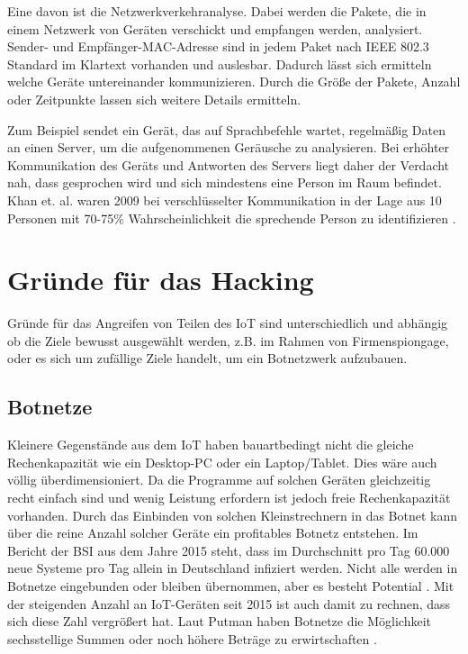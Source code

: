 \documentclass[12pt, a4paper, onecolumn, oneside, toc=bibliographynumbered, liststotoc]{scrreprt} %
\begin{document}
  Eine davon ist die Netzwerkverkehranalyse. Dabei werden die Pakete, die in einem Netzwerk von Geräten verschickt und empfangen werden, analysiert. Sender- und Empfänger\hyphen MAC\hyphen Adresse sind in jedem Paket nach IEEE 802.3 Standard im Klartext vorhanden und auslesbar. Dadurch lässt sich ermitteln welche Geräte untereinander kommunizieren. Durch die Größe der Pakete, Anzahl oder Zeitpunkte lassen sich weitere Details ermitteln.
  
  Zum Beispiel sendet ein Gerät, das auf Sprachbefehle wartet, regelmäßig Daten an einen Server, um die aufgenommenen Geräusche zu analysieren. Bei erhöhter Kommunikation des Geräts und Antworten des Servers liegt daher der Verdacht nah, dass gesprochen wird und sich mindestens eine Person im Raum befindet. Khan et. al. waren 2009 bei verschlüsselter Kommunikation in der Lage aus 10 Personen mit 70-75\% Wahrscheinlichkeit die sprechende Person zu identifizieren \parencite[70]{Khan.2010}.
		
	\chapter{Gründe für das Hacking}
 Gründe für das Angreifen von Teilen des IoT sind unterschiedlich und abhängig ob die Ziele bewusst ausgewählt werden, z.B. im Rahmen von Firmenspiongage, oder es sich um zufällige Ziele handelt, um ein Botnetzwerk aufzubauen.
 
		\section{Botnetze}
  Kleinere Gegenstände aus dem IoT haben bauartbedingt nicht die gleiche Rechenkapazität wie ein Desktop-PC oder ein Laptop/Tablet. Dies wäre auch völlig überdimensioniert. Da die Programme auf solchen Geräten gleichzeitig recht einfach sind und wenig Leistung erfordern ist jedoch freie Rechenkapazität vorhanden. Durch das Einbinden von solchen Kleinstrechnern in das Botnet kann über die reine Anzahl solcher Geräte ein profitables Botnetz entstehen. Im Bericht der BSI aus dem Jahre 2015 steht, dass im Durchschnitt pro Tag 60.000 neue Systeme pro Tag allein in Deutschland infiziert werden. Nicht alle werden in Botnetze eingebunden oder bleiben übernommen, aber es besteht Potential \parencite[30]{BundesamtfurSicherheitinderInformationstechnik.20210106}. Mit der steigenden Anzahl an IoT-Geräten seit 2015 ist auch damit zu rechnen, dass sich diese Zahl vergrößert hat. Laut Putman haben Botnetze die Möglichkeit sechsstellige Summen oder noch höhere Beträge zu erwirtschaften \parencite{Putman.2018}. 
  
\end{document}
